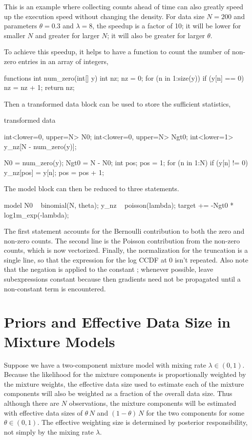 This is an example where collecting counts ahead of time can also
greatly speed up the execution speed without changing the density.
For data size $N=200$ and parameters $\theta=0.3$ and $\lambda = 8$,
the speedup is a factor of 10; it will be lower for smaller $N$ and
greater for larger $N$; it will also be greater for larger $\theta$.

To achieve this speedup, it helps to have a function to count the
number of non-zero entries in an array of integers,
%
\begin{stancode}
functions {
  int num_zero(int[] y) {
    int nz;
    nz = 0;
    for (n in 1:size(y))
      if (y[n] == 0)
        nz = nz + 1;
    return nz;
  }
}
\end{stancode}
%
Then a transformed data block can be used to store the sufficient
statistics,
%
\begin{stancode}
transformed data {
  int<lower=0, upper=N> N0;
  int<lower=0, upper=N> Ngt0;
  int<lower=1> y_nz[N - num_zero(y)];

  N0 = num_zero(y);
  Ngt0 = N - N0;
  { 
    int pos;
    pos = 1;
    for (n in 1:N) {
      if (y[n] != 0) {
        y_nz[pos] = y[n];
        pos = pos + 1;
      }
    }
  }
}
\end{stancode}
%
The model block can then be reduced to three statements.
%
\begin{stancode}
model {
  N0 ~ binomial(N, theta);
  y_nz ~ poisson(lambda);
  target += -Ngt0 * log1m_exp(-lambda);
}
\end{stancode}
%
The first statement accounts for the Bernoulli contribution to both
the zero and non-zero counts.  The second line is the Poisson
contribution from the non-zero counts, which is now vectorized.
Finally, the normalization for the truncation is a single line, so
that the expression for the log CCDF at 0 isn't repeated.  Also note
that the negation is applied to the constant ; whenever
possible, leave subexpressions constant because then gradients need
not be propagated until a non-constant term is encountered.


\section{Priors and Effective Data Size in Mixture Models}

Suppose we have a two-component mixture model with mixing rate
$\lambda \in (0, 1)$.  Because the likelihood for the mixture
components is proportionally weighted by the mixture weights, the
effective data size used to estimate each of the mixture components
will also be weighted as a fraction of the overall data size.  Thus
although there are $N$ observations, the mixture components will be
estimated with effective data sizes of $\theta \, N$ and $(1 - \theta)
\, N$ for the two components for some $\theta \in (0, 1)$.  The
effective weighting size is determined by posterior responsibility,
not simply by the mixing rate $\lambda$.

